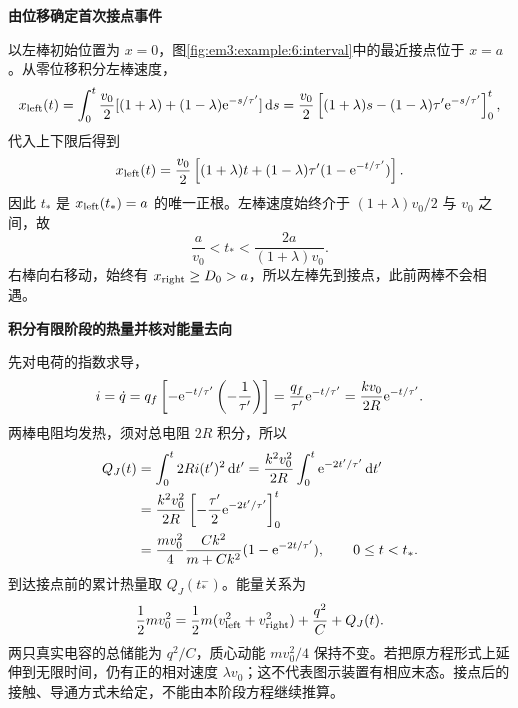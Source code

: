 \begin{solution}
\par\medskip{}\noindent\textbf{由位移确定首次接点事件}\par\nobreak
以左棒初始位置为 $x=0$，图\ref{fig:em3:example:6:interval}中的最近接点位于 $x=a$。从零位移积分左棒速度，
\[
 x_{\rm left}(t)=\int_0^t\frac{v_0}{2}
 [(1+\lambda)+(1-\lambda)\mathrm e^{-s/\tau'}]\mathop{}\!\mathrm d s
 =\frac{v_0}{2}
\left[(1+\lambda)s-(1-\lambda)\tau'\mathrm e^{-s/\tau'}\right]_0^t,
\]
代入上下限后得到
\[
x_{\rm left}(t)=\frac{v_0}2\left[(1+\lambda)t
 +(1-\lambda)\tau'(1-\mathrm e^{-t/\tau'})\right].
\]
因此 $t_*$ 是 $x_{\rm left}(t_*)=a$ 的唯一正根。左棒速度始终介于 $(1+\lambda)v_0/2$ 与 $v_0$ 之间，故
\[
\frac a{v_0}<t_*<\frac{2a}{(1+\lambda)v_0}.
\]
右棒向右移动，始终有 $x_{\rm right}\ge D_0>a$，所以左棒先到接点，此前两棒不会相遇。

\par\medskip{}\noindent\textbf{积分有限阶段的热量并核对能量去向}\par\nobreak
先对电荷的指数求导，
\[
 i=\dot q=q_f\left[-\mathrm e^{-t/\tau'}\left(-\frac1{\tau'}\right)\right]
 =\frac{q_f}{\tau'}\mathrm e^{-t/\tau'}
 =\frac{kv_0}{2R}\mathrm e^{-t/\tau'}.
\]
两棒电阻均发热，须对总电阻 $2R$ 积分，所以
\[
 \begin{aligned}
 Q_J(t)&=\int_0^t 2Ri(t')^2\mathop{}\!\mathrm d t'
 =\frac{k^2v_0^2}{2R}\int_0^t\mathrm e^{-2t'/\tau'}\mathop{}\!\mathrm d t'\\
 &=\frac{k^2v_0^2}{2R}
 \left[-\frac{\tau'}2\mathrm e^{-2t'/\tau'}\right]_0^t\\
 &=\frac{mv_0^2}{4}\frac{Ck^2}{m+Ck^2}
 (1-\mathrm e^{-2t/\tau'}),\qquad 0\le t<t_*.
 \end{aligned}
\]
到达接点前的累计热量取 $Q_J(t_*^-)$。能量关系为
\[
\frac12mv_0^2=\frac12m(v_{\rm left}^2+v_{\rm right}^2)
 +\frac{q^2}{C}+Q_J(t).
\]
两只真实电容的总储能为 $q^2/C$，质心动能 $mv_0^2/4$ 保持不变。若把原方程形式上延伸到无限时间，仍有正的相对速度 $\lambda v_0$；这不代表图示装置有相应末态。接点后的接触、导通方式未给定，不能由本阶段方程继续推算。
\end{solution}
